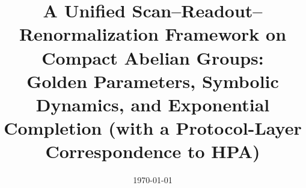 \documentclass[11pt,letterpaper]{article}
\title{A Unified Scan--Readout--Renormalization Framework on Compact Abelian Groups:\\\large Golden Parameters, Symbolic Dynamics, and Exponential Completion (with a Protocol-Layer Correspondence to HPA)}
\author{}
\date{\today}
\theoremstyle{plain}
\theoremstyle{definition}
\theoremstyle{remark}
\begin{document}
\sloppy
\maketitle
















\FloatBarrier
\appendix







\FloatBarrier

\end{document}
